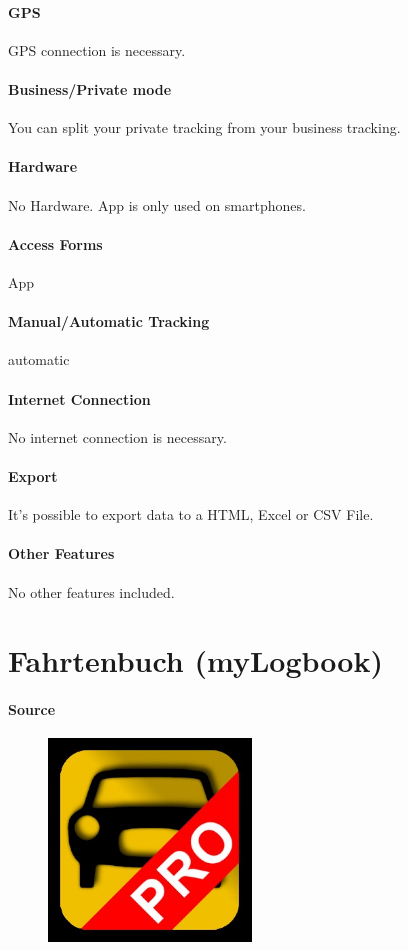 \paragraph{GPS} GPS connection is necessary.
\paragraph{Business/Private mode} You can split your private tracking from your business tracking.
\paragraph{Hardware} No Hardware. App is only used on smartphones.
\paragraph{Access Forms} App
\paragraph{Manual/Automatic Tracking} automatic
\paragraph{Internet Connection} No internet connection is necessary.
\paragraph{Export} It’s possible to export data to a HTML, Excel or CSV File.
\paragraph{Other Features} No other features included.
\newpage

\section{Fahrtenbuch (myLogbook)}
\paragraph{Source} 
\begin{figure}
  \begin{center}
    \includegraphics[width=0.48\textwidth]{fahrtenbuch2}
  \end{center}
\end{figure}
